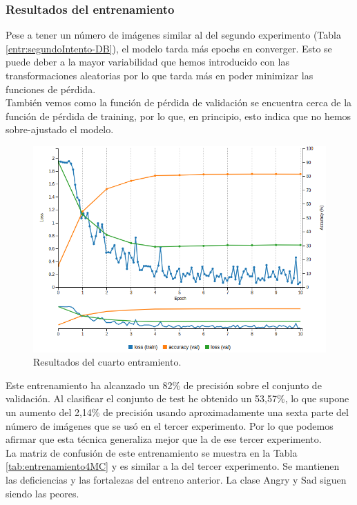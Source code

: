 \documentclass[a4paper,11pt]{book}
\begin{document}
\subsubsection{Resultados del entrenamiento}
Pese a tener un número de imágenes similar al del segundo experimento (Tabla \ref{entr:segundoIntento-DB}), el modelo tarda más epochs en converger. Esto se puede deber a la mayor variabilidad que hemos introducido con las transformaciones aleatorias por lo que tarda más en poder minimizar las funciones de pérdida.\\
También vemos como la función de pérdida de validación se encuentra cerca de la función de pérdida de training, por lo que, en principio, esto indica que no hemos sobre-ajustado el modelo.\\
\begin{figure}[h]
	\centering
	\includegraphics[width=0.9\linewidth]{imagenes/entrenamiento4results}
	\caption[Resultados del entrenamiento 4]{Resultados del cuarto entramiento.}
	\label{fig:entrenamiento4results}
\end{figure}

Este entrenamiento ha alcanzado un 82\% de precisión sobre el conjunto de validación. Al clasificar el conjunto de test he obtenido un 53,57\%, lo que supone un aumento del 2,14\% de precisión usando aproximadamente una sexta parte del número de imágenes que se usó en el tercer experimento. Por lo que podemos afirmar que esta técnica generaliza mejor que la de ese tercer experimento.\\
La matriz de confusión de este entrenamiento se muestra en la Tabla  \ref{tab:entrenamiento4MC} y es similar a la del tercer experimento. Se mantienen las deficiencias y las fortalezas del entreno anterior. La clase Angry y Sad siguen siendo las peores.
\end{document}
